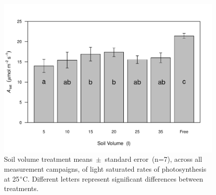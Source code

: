 \documentclass[a4paper]{article}\usepackage[]{graphicx}\usepackage[]{color}
\begin{document}
\begin{figure}[h!]
    \centering
    \includegraphics[width=0.99\textwidth]{Asat.pdf}
    \caption{Soil volume treatment means~$\pm$~standard error~(n=7), across all measurement campaigns, of light saturated rates of photosynthesis at 25$\degree$C. Different letters represent significant differences between treatments.}
    \label{fig:figure3}
\end{figure}
\end{document}
